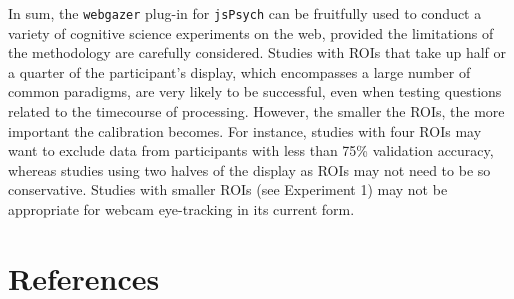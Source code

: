 \documentclass[
  man,floatsintext]{apa6}
\begin{document}
In sum, the \texttt{webgazer} plug-in for \texttt{jsPsych} can be fruitfully used to conduct a variety of cognitive science experiments on the web, provided the limitations of the methodology are carefully considered. Studies with ROIs that take up half or a quarter of the participant's display, which encompasses a large number of common paradigms, are very likely to be successful, even when testing questions related to the timecourse of processing. However, the smaller the ROIs, the more important the calibration becomes. For instance, studies with four ROIs may want to exclude data from participants with less than 75\% validation accuracy, whereas studies using two halves of the display as ROIs may not need to be so conservative. Studies with smaller ROIs (see Experiment 1) may not be appropriate for webcam eye-tracking in its current form.

\newpage

\section{References}\label{references}

\begingroup
\setlength{\parindent}{-0.5in}
\setlength{\leftskip}{0.5in}
\end{document}
